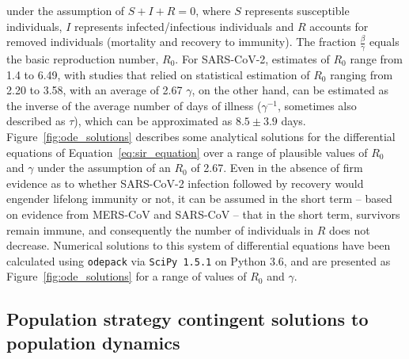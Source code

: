 \documentclass{article}
\begin{document}
\noindent under the assumption of $S + I + R = 0$, where $S$ represents susceptible individuals, $I$ represents infected/infectious individuals and $R$ accounts for removed individuals (mortality and recovery to immunity). The fraction $\frac{\beta}{\gamma}$ equals the basic reproduction number, $R_0$. For SARS-CoV-2, estimates of $R_0$ range from 1.4 to 6.49, with studies that relied on statistical estimation of $R_0$ ranging from 2.20 to 3.58, with an average of 2.67\cite{liu2020reproductive} $\gamma$, on the other hand, can be estimated as the inverse of the average number of days of illness ($\gamma^{-1}$, sometimes also described as $\tau$), which can be approximated as $8.5 \pm 3.9$ days.\cite{pan2020clinical,liu2020risk} Figure~\ref{fig:ode_solutions} describes some analytical solutions for the differential equations of Equation~\eqref{eq:sir_equation} over a range of plausible values of $R_0$ and $\gamma$ under the assumption of an $R_0$ of 2.67. Even in the absence of firm evidence as to whether SARS-CoV-2 infection followed by recovery would engender lifelong immunity or not,\cite{roy2020covid,ota2020will,lin2020duration} it can be assumed in the short term -- based on evidence from MERS-CoV and SARS-CoV -- that in the short term, survivors remain immune,\cite{prompetchara2020immune} and consequently the number of individuals in $R$ does not decrease. Numerical solutions to this system of differential equations have been calculated using \texttt{odepack} via \texttt{SciPy 1.5.1}\cite{virtanen2020scipy} on Python 3.6, and are presented as Figure~\ref{fig:ode_solutions} for a range of values of $R_0$ and $\gamma$.


\subsection{Population strategy contingent solutions to population dynamics} %
\label{sub:population_strategy_contingent_solutions_to_population_dynamics}
\end{document}
